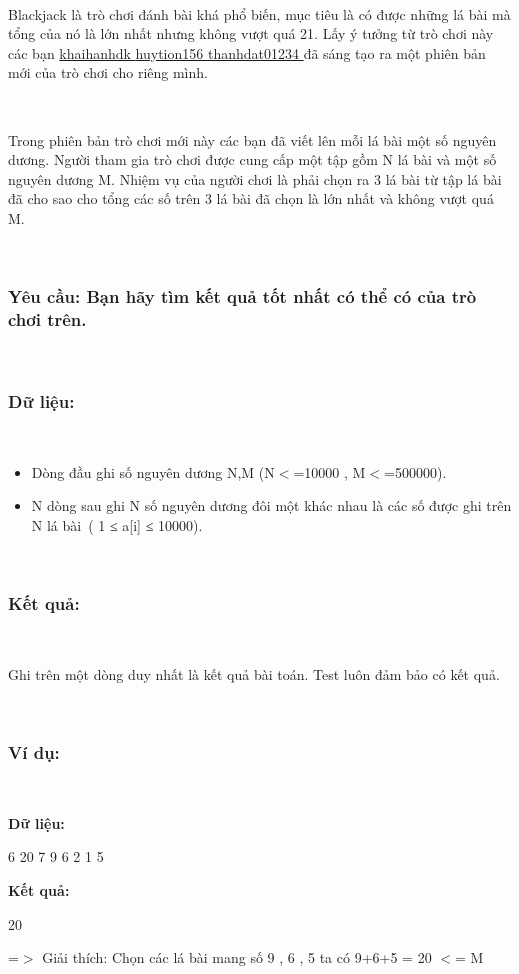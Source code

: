 

 

Blackjack là trò chơi đánh bài khá phổ biến, mục tiêu là có được những lá bài mà tổng của nó là lớn nhất nhưng không vượt quá 21. Lấy ý tưởng từ trò chơi này các bạn \href{http://vnoi.info/index.php?option=com_voj2&amp;page=user&amp;user=khaihanhdk}{ khaihanhdk }\href{http://vnoi.info/index.php?option=com_voj2&amp;page=user&amp;user=huytion156}{ huytion156 }\href{http://vnoi.info/index.php?option=com_voj2&amp;page=user&amp;user=thanhdat01234}{ thanhdat01234 } đã sáng tạo ra một phiên bản mới của trò chơi cho riêng mình.

 

Trong phiên bản trò chơi mới này các bạn đã viết lên mỗi lá bài một số nguyên dương. Người tham gia trò chơi được cung cấp một tập gồm N lá bài và một số nguyên dương M. Nhiệm vụ của người chơi là phải chọn ra 3 lá bài từ tập lá bài đã cho sao cho tổng các số trên 3 lá bài đã chọn là lớn nhất và không vượt quá M.

 

\subsubsection{Yêu cầu: Bạn hãy tìm kết quả tốt nhất có thể có của trò chơi trên.}

 

\subsubsection{Dữ liệu:}

 
\begin{itemize}
	\item Dòng đầu ghi số nguyên dương N,M (N$<$=10000 , M$<$=500000).
	\item N dòng sau ghi N số nguyên dương đôi một khác nhau là các số được ghi trên N lá bài ( 1 ≤ a[i] ≤ 10000).
\end{itemize}

 

\subsubsection{Kết quả:}

 

Ghi trên một dòng duy nhất là kết quả bài toán. Test luôn đảm bảo có kết quả.

 

\subsubsection{Ví dụ:}

 

\textbf{Dữ liệu: }

6 20 7 9 6 2 1 5

\textbf{Kết quả: }

20

=$>$ Giải thích: Chọn các lá bài mang số 9 , 6 , 5 ta có 9+6+5 = 20 $<$= M